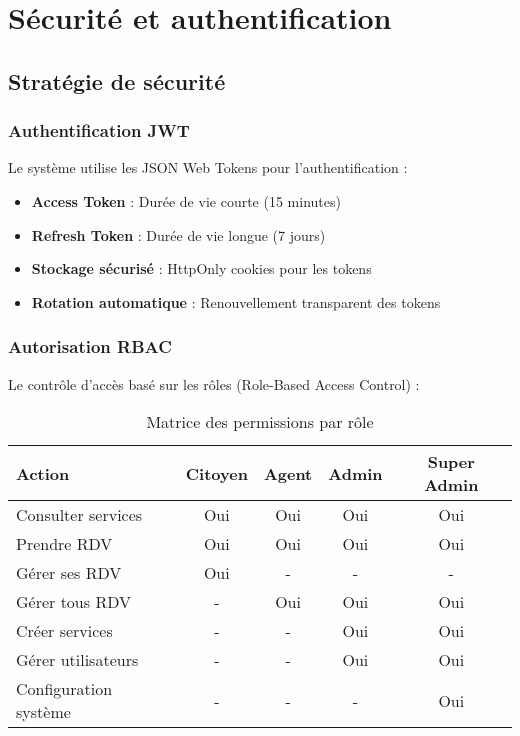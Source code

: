 \section{Sécurité et authentification}

\subsection{Stratégie de sécurité}

\subsubsection{Authentification JWT}

Le système utilise les JSON Web Tokens pour l'authentification :

\begin{itemize}
\item \textbf{Access Token} : Durée de vie courte (15 minutes)
\item \textbf{Refresh Token} : Durée de vie longue (7 jours)
\item \textbf{Stockage sécurisé} : HttpOnly cookies pour les tokens
\item \textbf{Rotation automatique} : Renouvellement transparent des tokens
\end{itemize}

\subsubsection{Autorisation RBAC}

Le contrôle d'accès basé sur les rôles (Role-Based Access Control) :

\begin{table}[H]
\centering
\caption{Matrice des permissions par rôle}
\begin{tabular}{|l|c|c|c|c|}
\hline
\textbf{Action} & \textbf{Citoyen} & \textbf{Agent} & \textbf{Admin} & \textbf{Super Admin} \\
\hline
Consulter services & Oui & Oui & Oui & Oui \\
Prendre RDV & Oui & Oui & Oui & Oui \\
Gérer ses RDV & Oui & - & - & - \\
Gérer tous RDV & - & Oui & Oui & Oui \\
Créer services & - & - & Oui & Oui \\
Gérer utilisateurs & - & - & Oui & Oui \\
Configuration système & - & - & - & Oui \\
\hline
\end{tabular}
\end{table}

